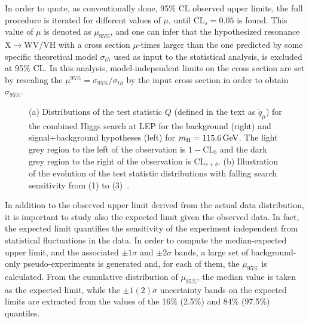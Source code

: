 In order to quote, as conventionally done, 95\% CL observed upper limits, the full procedure is iterated for different values of $\mu$, until $\mathrm{CL}_s = 0.05$ is found.
This value of $\mu$ is denoted as $\mu_{95\%}$, and one can infer that the hypothesized resonance X$\rightarrow$WV/VH with a cross section $\mu$-times larger than the one predicted 
by some specific theoretical model $\sigma_{th}$ used as input to the statistical analysis, is excluded at 95\% CL.
In this analysis, model-independent limits on the cross section are set by rescaling the $\mu^{95\%} = \sigma_{95\%}/\sigma_{th}$ by the input cross section in order to obtain $\sigma_{95\%}$.

\begin{figure}[!htb]
\centering
{}
\caption{(a) Distributions of the test statistic $Q$ (defined in the text as $\tilde{q}_\mu$) for the combined Higgs search at LEP for the background (right) and signal+background hypotheses (left) for $m_\mathrm{H} = 115.6\,\text{Ge\hspace{-.08em}V}$.
The light grey region to the left of the observation is $1-\mathrm{CL}_b$ and the dark grey region to the right of the observation is $\mathrm{CL}_{s+b}$. (b) Illustration of the evolution of the test statistic distributions with falling search sensitivity from (1) to (3)~\cite{CLs1}.}
\label{fig:CLs-ex}
\end{figure}

In addition to the observed upper limit derived from the actual data distribution, it is important to study also the expected limit given the observed data.
In fact, the expected limit quantifies the sensitivity of the experiment independent from statistical fluctuations in the data.
In order to compute the median-expected upper limit, and the associated $\pm 1\sigma$ and $\pm 2\sigma$ bands,
a large set of background-only pseudo-experiments is generated and, for each of them, the $\mu_{95\%}$ is calculated.
From the cumulative distribution of $\mu_{95\%}$, the median value is taken as the expected limit, while the $\pm 1(2)\sigma$ uncertainty bands on the expected limits
are extracted from the values of the 16\% (2.5\%) and 84\% (97.5\%) quantiles.

